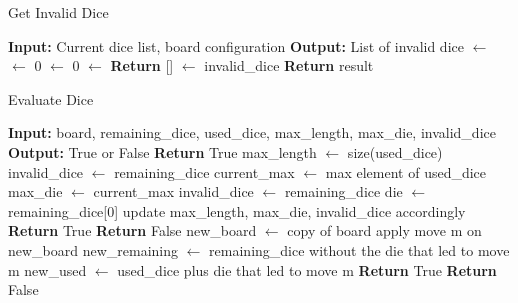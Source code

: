 \begin{algorithm}[H]
    \caption{Get Invalid Dice}
\label{alg:getInvalidDice}
    \begin{algorithmic}
    \State \textbf{Input:} Current dice list, board configuration
    \State \textbf{Output:} List of invalid dice
    \State {} $\gets$ 
    \State {} $\gets$ 0
    \State {} $\gets$ 0
    \State {} $\gets$ 
    \State
        \State \textbf{Return} [] 
    \Else {}
        \State {} $\gets$ invalid\_dice
            \State {}
        \EndFor
        \State \textbf{Return} result
    \EndIf
    \end{algorithmic}
    
\end{algorithm}

\begin{algorithm}[H]
    \caption{Evaluate Dice} \label{alg:evaluateDice}
    \begin{algorithmic}
    \State \textbf{Input:} board, remaining\_dice, used\_dice, max\_length, max\_die, invalid\_dice
    \State \textbf{Output:} True or False
    \State
     
        \State \textbf{Return} True
    \EndIf
    \State
     
        \State max\_length $\gets$ size(used\_dice)
        \State invalid\_dice $\gets$ remaining\_dice
        \State current\_max $\gets$ max element of used\_dice
            \State max\_die $\gets$ current\_max
            \State invalid\_dice $\gets$ remaining\_dice
        \EndIf
    \EndIf
    \State
     
        \State die $\gets$ remaining\_dice[0]
                \State update max\_length, max\_die, invalid\_dice accordingly
                \State \textbf{Return} True
            \EndIf
        \EndFor
        \State \textbf{Return} False 
    \EndIf
    \State
        \State new\_board $\gets$ copy of board
        \State apply move m on new\_board
        \State new\_remaining $\gets$ remaining\_dice without the die that led to move m
        \State new\_used $\gets$ used\_dice plus die that led to move m
            \State \textbf{Return} True
        \EndIf
    \EndFor
    \State \textbf{Return} False
    \end{algorithmic}
\end{algorithm}

